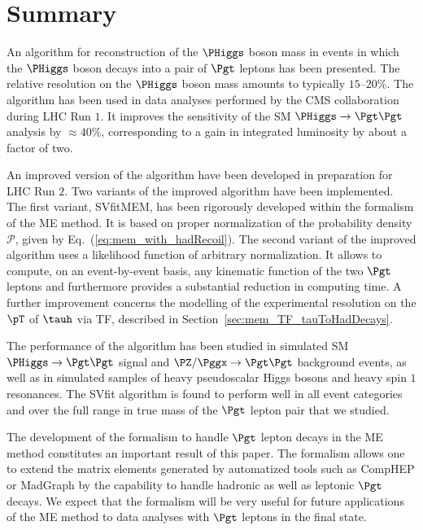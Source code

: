 \section{Summary}
\label{sec:summary}

An algorithm for reconstruction of the $\PHiggs$ boson mass in events
in which the $\PHiggs$ boson decays into a pair of $\Pgt$ leptons has been
presented.
The relative resolution on the $\PHiggs$ boson mass amounts to typically
$15$--$20\%$.
The algorithm has been used in data analyses performed by the CMS
collaboration during LHC Run $1$.
It improves the sensitivity of the SM $\PHiggs \to \Pgt\Pgt$ analysis by $\approx 40\%$,
corresponding to a gain in integrated luminosity by about a factor of two.

An improved version of the algorithm have been developed in preparation
for LHC Run $2$.
Two variants of the improved algorithm have been implemented.
The first variant, SVfitMEM, has been rigorously developed within the
formalism of the ME method. It is based on proper normalization of the probability density 
$\mathcal{P}$, given by Eq.~(\ref{eq:mem_with_hadRecoil}).
The second variant of the improved algorithm uses a likelihood
function of arbitrary normalization.
It allows to compute, on an event-by-event basis, any kinematic
function of the two $\Pgt$ leptons and furthermore provides a substantial
reduction in computing time.
A further improvement concerns the modelling of the experimental
resolution on the $\pT$ of $\tauh$ via TF, described in
Section~\ref{sec:mem_TF_tauToHadDecays}.

The performance of the algorithm has been studied in simulated SM
$\PHiggs \to \Pgt\Pgt$ signal and $\PZ/\Pggx \to \Pgt\Pgt$ background
events, as well as in simulated samples of heavy pseudoscalar Higgs
bosons and heavy spin $1$ resonances.
The SVfit algorithm is found to perform well in all event
categories and over the full range in true mass of the $\Pgt$ lepton
pair that we studied.

The development of the formalism to handle $\Pgt$ lepton decays
in the ME method constitutes an important result of this paper.
The formalism allows one to extend the matrix elements generated by automatized tools such as
CompHEP or MadGraph by the capability to handle hadronic as well as leptonic $\Pgt$ decays.
We expect that the formalism will be very useful for future
applications of the ME method to data analyses with $\Pgt$ leptons in
the final state. 

